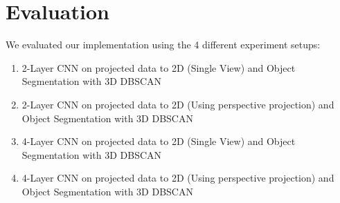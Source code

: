 \section{Evaluation}\label{sec:Evaluation}

We evaluated our implementation using the 4 different experiment setups: 
\begin{enumerate}
  \item 2-Layer CNN on projected data to 2D (Single View) and Object Segmentation with 3D DBSCAN
  \item 2-Layer CNN on projected data to 2D (Using perspective projection) and Object Segmentation with 3D DBSCAN
  \item 4-Layer CNN on projected data to 2D (Single View) and Object Segmentation with 3D DBSCAN
  \item 4-Layer CNN on projected data to 2D (Using perspective projection) and Object Segmentation with 3D DBSCAN
\end{enumerate}

